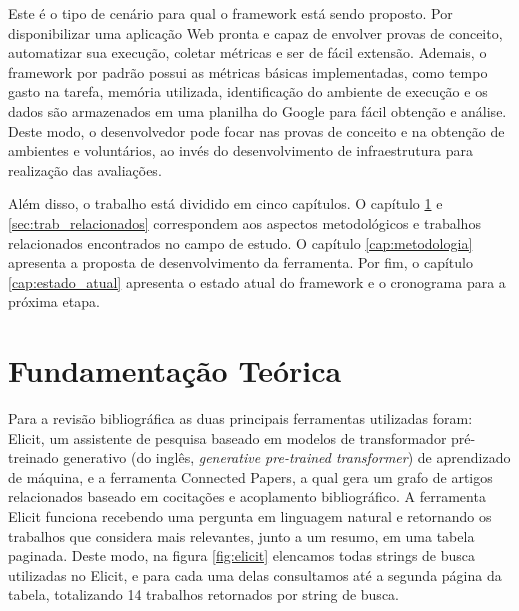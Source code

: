 \documentclass[12pt]{tcc}
\begin{document}
Este é o tipo de cenário para qual o framework está sendo proposto.
Por disponibilizar uma aplicação Web pronta e capaz de envolver provas de conceito, automatizar sua execução, coletar métricas e ser de fácil extensão.
Ademais, o framework por padrão possui as métricas básicas implementadas, como tempo gasto na tarefa, memória utilizada, identificação do ambiente de execução e os dados são armazenados em uma planilha do Google para fácil obtenção e análise.
Deste modo, o desenvolvedor pode focar nas provas de conceito e na obtenção de ambientes e voluntários, ao invés do desenvolvimento de infraestrutura para realização das avaliações.

Além disso, o trabalho está dividido em cinco capítulos.
O capítulo \ref{cap:fund_teorica} e \ref{sec:trab_relacionados} correspondem aos aspectos metodológicos e trabalhos relacionados encontrados no campo de estudo.
O capítulo \ref{cap:metodologia} apresenta a proposta de desenvolvimento da ferramenta.
Por fim, o capítulo \ref{cap:estado_atual} apresenta o estado atual do framework e o cronograma para a próxima etapa.


\chapter{Fundamentação Teórica}
\label{cap:fund_teorica}

Para a revisão bibliográfica as duas principais ferramentas utilizadas foram: Elicit, um assistente de pesquisa baseado em modelos de transformador pré-treinado generativo (do inglês, \emph{generative pre-trained transformer}) de aprendizado de máquina, e a ferramenta Connected Papers, a qual  gera um grafo de artigos relacionados baseado em cocitações e acoplamento bibliográfico.
A ferramenta Elicit funciona recebendo uma pergunta em linguagem natural e retornando os trabalhos que considera mais relevantes, junto a um resumo, em uma tabela paginada.
Deste modo, na figura \ref{fig:elicit} elencamos todas strings de busca utilizadas no Elicit, e para cada uma delas consultamos até a segunda página da tabela, totalizando 14 trabalhos retornados por string de busca.
\end{document}
